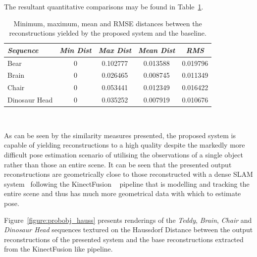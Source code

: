 The resultant quantitative comparisons may be found in Table~\ref{table:probobj_hauss}.
\begin{table}[!htbp]
  \centering
  \begin{tabular}{lcccc}
    \emph{Sequence} & \emph{Min Dist} & \emph{Max Dist} & \emph{Mean Dist} & \emph{RMS}\\
    \midrule
    \textsf{Bear} & 0 & 0.102777 & 0.013588 & 0.019796 \\
    \textsf{Brain} & 0 & 0.026465 & 0.008745 & 0.011349 \\
    \textsf{Chair} & 0 & 0.053441 & 0.012349 & 0.016422 \\
    \textsf{Dinosaur Head} & 0 & 0.035252 & 0.007919 & 0.010676
  \end{tabular}
  \caption[Probabilistic Object Reconstruction Hausdorff Distance]
  {Minimum, maximum, mean and RMSE distances between the reconstructions yielded by 
  the proposed system and the baseline.}
~\label{table:probobj_hauss}
\end{table}

As can be seen by the similarity measures presented, the proposed system is capable of 
yielding reconstructions to a high quality despite the markedly more difficult pose estimation 
scenario of utilising the observations of a single object rather than those an entire scene. 
It can be seen that the presented output reconstructions are geometrically close to those 
reconstructed with a dense SLAM system~\cite{Prisacariu2014} following the KinectFusion 
~\cite{Newcombe2011} pipeline that is modelling and tracking the entire scene and thus has 
much more geometrical data with which to estimate pose.

Figure~\ref{figure:probobj_hauss} presents renderings of the \textit{Teddy}, 
\textit{Brain}, \textit{Chair} and \textit{Dinosaur Head} sequences textured 
on the Haussdorf Distance between the output reconstructions of the presented 
system and the base reconstructions extracted from the KinectFusion like pipeline.


